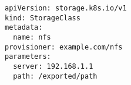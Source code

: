 \begin{verbatim}
apiVersion: storage.k8s.io/v1
kind: StorageClass
metadata:
  name: nfs
provisioner: example.com/nfs
parameters:
  server: 192.168.1.1
  path: /exported/path
\end{verbatim}